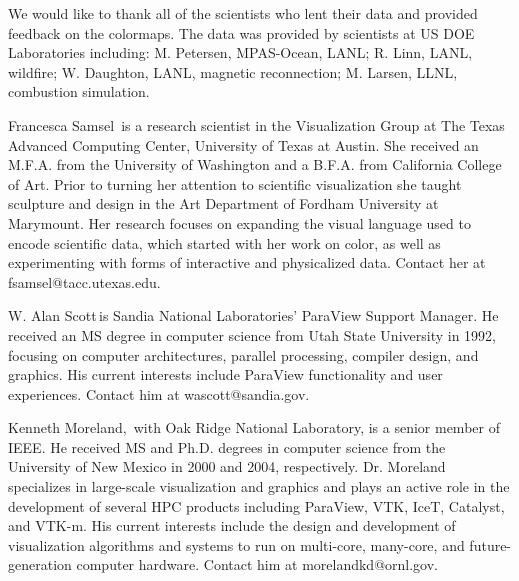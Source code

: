 \documentclass{IEEEcsmag}
\begin{document}
We would like to thank all of the scientists who lent their data and provided feedback on the colormaps. The data was provided by scientists at US DOE Laboratories including: M. Petersen, MPAS-Ocean, LANL; R. Linn, LANL, wildfire; W. Daughton, LANL, magnetic reconnection; M. Larsen, LLNL, combustion simulation.





\begin{IEEEbiography}{Francesca Samsel}{\,} is a research scientist in the Visualization Group at The Texas Advanced Computing Center, University of Texas at Austin. She received an M.F.A. from the University of Washington and a B.F.A. from California College of Art. Prior to turning her attention to scientific visualization she taught sculpture and design in the Art Department of Fordham University at Marymount. Her research focuses on expanding the visual language used to encode scientific data, which started with her work on color, as well as experimenting with forms of interactive and physicalized data. Contact her at fsamsel@tacc.utexas.edu.
\end{IEEEbiography}

\begin{IEEEbiography}{W. Alan Scott}{\,}is Sandia National Laboratories' ParaView Support Manager.  He received an MS degree in computer science from Utah State University in 1992, focusing on computer architectures, parallel processing, compiler design, and graphics.  His current interests include ParaView functionality and user experiences.  Contact him at wascott@sandia.gov.
\end{IEEEbiography}

\begin{IEEEbiography}{Kenneth Moreland,}{\,} with Oak Ridge National Laboratory, is a senior member of IEEE.
  He received MS and Ph.D. degrees in computer science from the University of New Mexico in 2000 and 2004, respectively.
  Dr. Moreland specializes in large-scale visualization and graphics and plays an active role in the development of several HPC products including ParaView, VTK, IceT, Catalyst, and VTK-m.
  His current interests include the design and development of visualization algorithms and systems to run on multi-core, many-core, and future-generation computer hardware.
  Contact him at morelandkd@ornl.gov.
\end{IEEEbiography}
\end{document}
